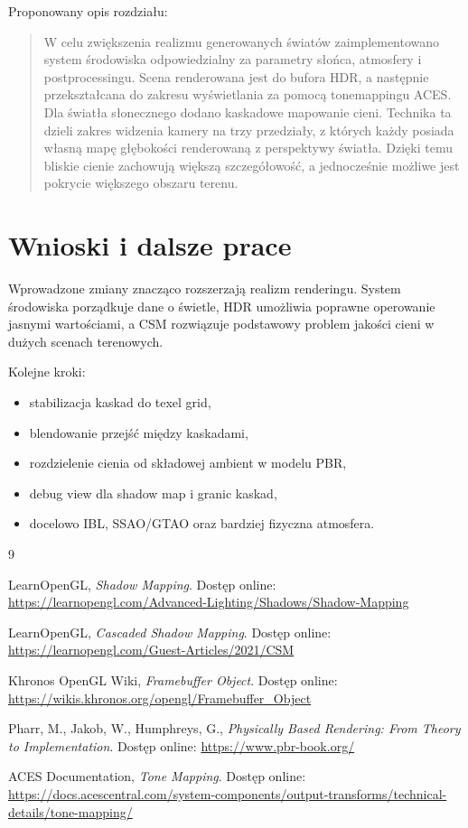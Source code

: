 \documentclass[12pt,a4paper]{article}
\begin{document}
Proponowany opis rozdziału:

\begin{quote}
W celu zwiększenia realizmu generowanych światów zaimplementowano system środowiska odpowiedzialny za parametry słońca, atmosfery i postprocessingu. Scena renderowana jest do bufora HDR, a następnie przekształcana do zakresu wyświetlania za pomocą tonemappingu ACES. Dla światła słonecznego dodano kaskadowe mapowanie cieni. Technika ta dzieli zakres widzenia kamery na trzy przedziały, z których każdy posiada własną mapę głębokości renderowaną z perspektywy światła. Dzięki temu bliskie cienie zachowują większą szczegółowość, a jednocześnie możliwe jest pokrycie większego obszaru terenu.
\end{quote}

\section{Wnioski i dalsze prace}

Wprowadzone zmiany znacząco rozszerzają realizm renderingu. System środowiska porządkuje dane o świetle, HDR umożliwia poprawne operowanie jasnymi wartościami, a CSM rozwiązuje podstawowy problem jakości cieni w dużych scenach terenowych.

Kolejne kroki:

\begin{itemize}
    \item stabilizacja kaskad do texel grid,
    \item blendowanie przejść między kaskadami,
    \item rozdzielenie cienia od składowej ambient w modelu PBR,
    \item debug view dla shadow map i granic kaskad,
    \item docelowo IBL, SSAO/GTAO oraz bardziej fizyczna atmosfera.
\end{itemize}

\begin{thebibliography}{9}

LearnOpenGL, \textit{Shadow Mapping}. Dostęp online:
\url{https://learnopengl.com/Advanced-Lighting/Shadows/Shadow-Mapping}

LearnOpenGL, \textit{Cascaded Shadow Mapping}. Dostęp online:
\url{https://learnopengl.com/Guest-Articles/2021/CSM}

Khronos OpenGL Wiki, \textit{Framebuffer Object}. Dostęp online:
\url{https://wikis.khronos.org/opengl/Framebuffer_Object}

Pharr, M., Jakob, W., Humphreys, G., \textit{Physically Based Rendering: From Theory to Implementation}. Dostęp online:
\url{https://www.pbr-book.org/}

ACES Documentation, \textit{Tone Mapping}. Dostęp online:
\url{https://docs.acescentral.com/system-components/output-transforms/technical-details/tone-mapping/}

\end{thebibliography}
\end{document}
